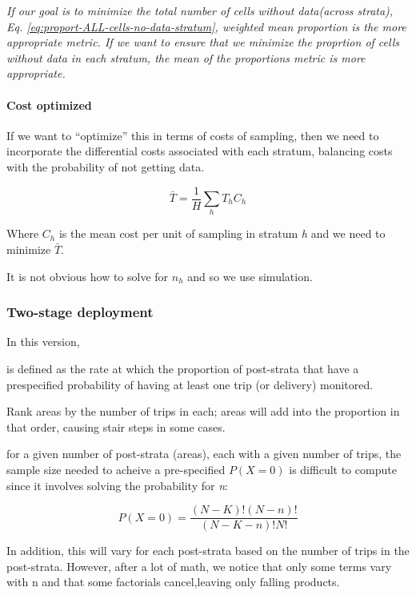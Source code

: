 \documentclass[
]{article}
\begin{document}
\emph{If our goal is to minimize the total number of cells without
data(across strata), Eq. \eqref{eq:proport-ALL-cells-no-data-stratum}, weighted
mean proportion is the more appropriate metric. If we want to ensure that we
minimize the proprtion of cells without data in each stratum, the mean of the
proportions metric is more appropriate.}

\hypertarget{cost-optimized}{%
\paragraph{Cost optimized}\label{cost-optimized}}

If we want to ``optimize'' this in terms of costs of sampling, then we need to
incorporate the differential costs associated with each stratum, balancing
costs with the probability of not getting data.

\begin{equation}   
  \bar{T} = \frac{1}{H} \sum_{h}T_hC_h 
 \label{eq:cost-weighted-boxes} 
\end{equation}

Where \(C_h\) is the mean cost per unit of sampling in stratum \emph{h} and we need
to minimize \(\bar{T}\).

It is not obvious how to solve for \(n_h\) and so we use simulation.

\hypertarget{two-stage-deployment}{%
\subsubsection{Two-stage deployment}\label{two-stage-deployment}}

In this version,

is defined as the rate at which the proportion of post-strata that have a
prespecified probability of having at least one trip (or delivery) monitored.

Rank areas by the number of trips in each; areas will add into the proportion
in that order, causing stair steps in some cases.

for a given number of post-strata (areas), each with a given number of trips,
the sample size needed to acheive a pre-specified \(P(X=0)\) is difficult to
compute since it involves solving the probability for \emph{n}:

\[
P(X=0) = \frac{(N-K)!(N-n)!}{(N-K-n)!N!}
\]

In addition, this will vary for each post-strata based on the number of trips
in the post-strata. However, after a lot of math, we notice that only some
terms vary with n and that some factorials cancel,leaving only falling products.
\end{document}
